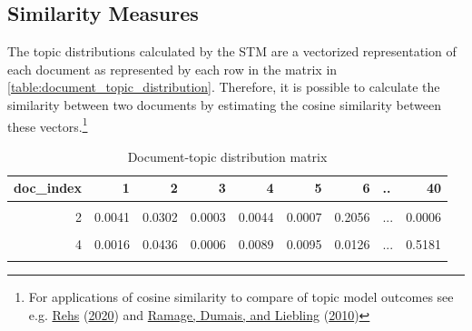 \documentclass[
  12pt,
]{article}
\begin{document}
\hypertarget{similarity-measures}{%
\subsection{Similarity Measures}\label{similarity-measures}}

The topic distributions calculated by the STM are a vectorized
representation of each document as represented by each row in the matrix
in \autoref{table:document_topic_distribution}. Therefore, it is
possible to calculate the similarity between two documents by estimating
the cosine similarity between these vectors.\footnote{For applications
  of cosine similarity to compare of topic model outcomes see e.g.
  \protect\hyperlink{ref-rehs_structural_2020}{Rehs}
  (\protect\hyperlink{ref-rehs_structural_2020}{2020}) and
  \protect\hyperlink{ref-ramage_characterizing_2010}{Ramage, Dumais, and
  Liebling} (\protect\hyperlink{ref-ramage_characterizing_2010}{2010})}

\begin{table}[H]

\caption{\label{tab:Document-topic distribution matrix - sample values}Document-topic distribution matrix \label{table:document_topic_distribution}}
\centering
\fontsize{7}{9}\selectfont
\begin{tabular}[t]{rrrrrrrlr}
\toprule
doc\_index & 1 & 2 & 3 & 4 & 5 & 6 & .. & 40\\
\midrule
\cellcolor{gray!6}{1} & \cellcolor{gray!6}{0.0016} & \cellcolor{gray!6}{0.0453} & \cellcolor{gray!6}{0.0005} & \cellcolor{gray!6}{0.0078} & \cellcolor{gray!6}{0.0151} & \cellcolor{gray!6}{0.0118} & \cellcolor{gray!6}{...} & \cellcolor{gray!6}{0.4376}\\
2 & 0.0041 & 0.0302 & 0.0003 & 0.0044 & 0.0007 & 0.2056 & ... & 0.0006\\
\cellcolor{gray!6}{3} & \cellcolor{gray!6}{0.0043} & \cellcolor{gray!6}{0.0039} & \cellcolor{gray!6}{0.0012} & \cellcolor{gray!6}{0.0003} & \cellcolor{gray!6}{0.0017} & \cellcolor{gray!6}{0.0266} & \cellcolor{gray!6}{...} & \cellcolor{gray!6}{0.0050}\\
4 & 0.0016 & 0.0436 & 0.0006 & 0.0089 & 0.0095 & 0.0126 & ... & 0.5181\\
\cellcolor{gray!6}{5} & \cellcolor{gray!6}{0.0016} & \cellcolor{gray!6}{0.0515} & \cellcolor{gray!6}{0.0002} & \cellcolor{gray!6}{0.0122} & \cellcolor{gray!6}{0.0050} & \cellcolor{gray!6}{0.0121} & \cellcolor{gray!6}{...} & \cellcolor{gray!6}{0.5750}\\
\bottomrule
\end{tabular}
\end{table}
\end{document}
